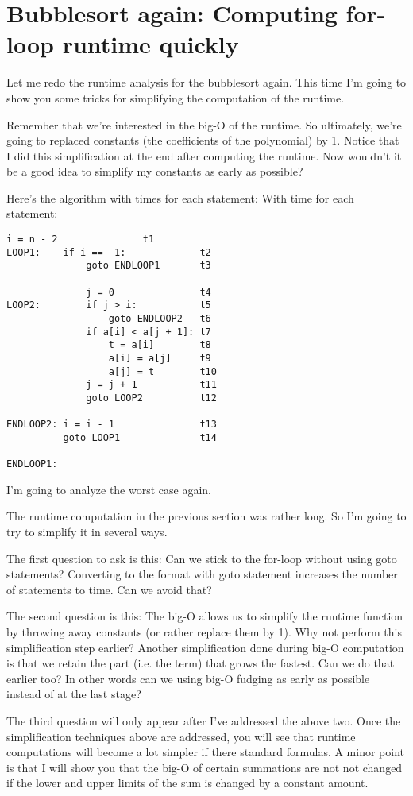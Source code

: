 \section{Bubblesort again: Computing for-loop runtime
quickly}

Let me redo the runtime analysis for the bubblesort again.
This time I'm going to show you some tricks for simplifying the 
computation of the runtime.

Remember that we're interested in the big-O of the runtime.
So ultimately, we're going to replaced constants (the coefficients
of the polynomial) by 1.
Notice that I did this simplification at the end after
computing the runtime.
Now wouldn't it be a good idea to simplify my constants
as early as possible?

Here's the algorithm with times for each statement:
With time for each statement:
\begin{Verbatim}[frame=single, fontsize=\footnotesize]
          i = n - 2               t1
LOOP1:    if i == -1:             t2
              goto ENDLOOP1       t3

              j = 0               t4
LOOP2:        if j > i:           t5
                  goto ENDLOOP2   t6
              if a[i] < a[j + 1]: t7
                  t = a[i]        t8
                  a[i] = a[j]     t9
                  a[j] = t        t10
              j = j + 1           t11
              goto LOOP2          t12

ENDLOOP2: i = i - 1               t13
          goto LOOP1              t14

ENDLOOP1:
\end{Verbatim}
I'm going to analyze the worst case again.

The runtime computation in the previous section 
was rather long.
So I'm going to try to simplify it in several ways.

\begin{itemize}

\li The first question to ask is this: Can we stick to the for-loop
    without using goto statements? Converting to the format with goto
statement increases the number of statements to time.
Can we avoid that?

\li The second question is this:
The big-O allows us to simplify the runtime
function by throwing away constants (or rather replace them by 1).
Why not perform this simplification step earlier?
Another simplification done during big-O computation is that
we retain the part (i.e. the term) that grows the fastest.
Can we do that earlier too? In other words can we using
big-O fudging as early as possible instead of at the last stage?

\li The third question will only appear after I've addressed the above two.
Once the simplification techniques above are addressed,
you will see that runtime computations will become a lot simpler if there
standard formulas. A minor point is that I will show you that 
the big-O of certain summations are not not changed if the lower and upper 
limits of the sum is changed by a constant amount.

\end{itemize}

